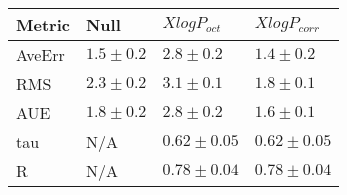 \begin{tabular}{| l |l |l | l |} 
\hline 
Metric & Null  & $XlogP_{oct}$ & $XlogP_{corr}$ \\ 
\hline 
AveErr & $ 1.5 \pm 0.2 $ & $ 2.8 \pm 0.2 $ & $ 1.4 \pm 0.2 $ \\ 
RMS & $ 2.3 \pm 0.2 $ & $ 3.1 \pm 0.1 $ & $ 1.8 \pm 0.1 $ \\ 
AUE & $ 1.8 \pm 0.2 $ & $ 2.8 \pm 0.2 $ & $ 1.6 \pm 0.1 $ \\ 
tau & N/A & $ 0.62 \pm 0.05 $ & $ 0.62 \pm 0.05 $ \\ 
R & N/A & $ 0.78 \pm 0.04 $ & $ 0.78 \pm 0.04 $ \\ 
\hline
\end{tabular}
